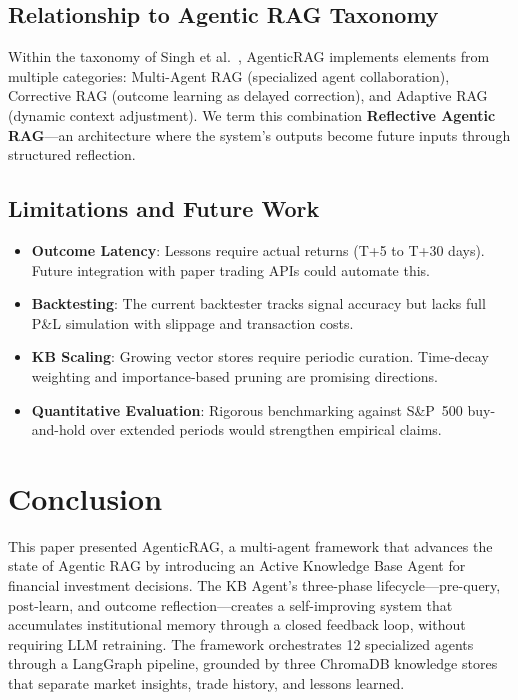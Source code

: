 \documentclass[conference]{IEEEtran}
\begin{document}
\subsection{Relationship to Agentic RAG Taxonomy}

Within the taxonomy of Singh et al.~\cite{singh2025agenticrag}, AgenticRAG implements elements from multiple categories: Multi-Agent RAG (specialized agent collaboration), Corrective RAG (outcome learning as delayed correction), and Adaptive RAG (dynamic context adjustment). We term this combination \textbf{Reflective Agentic RAG}---an architecture where the system's outputs become future inputs through structured reflection.

\subsection{Limitations and Future Work}

\begin{itemize}
\item \textbf{Outcome Latency}: Lessons require actual returns (T+5 to T+30 days). Future integration with paper trading APIs could automate this.
\item \textbf{Backtesting}: The current backtester tracks signal accuracy but lacks full P\&L simulation with slippage and transaction costs.
\item \textbf{KB Scaling}: Growing vector stores require periodic curation. Time-decay weighting and importance-based pruning are promising directions.
\item \textbf{Quantitative Evaluation}: Rigorous benchmarking against S\&P~500 buy-and-hold over extended periods would strengthen empirical claims.
\end{itemize}

\section{Conclusion}

This paper presented AgenticRAG, a multi-agent framework that advances the state of Agentic RAG by introducing an Active Knowledge Base Agent for financial investment decisions. The KB Agent's three-phase lifecycle---pre-query, post-learn, and outcome reflection---creates a self-improving system that accumulates institutional memory through a closed feedback loop, without requiring LLM retraining. The framework orchestrates 12 specialized agents through a LangGraph pipeline, grounded by three ChromaDB knowledge stores that separate market insights, trade history, and lessons learned.
\end{document}
